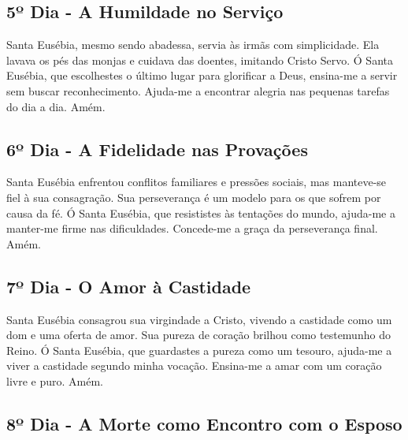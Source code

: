 \documentclass[a4paper,14pt]{extarticle} \usepackage[utf8]{inputenc}
\begin{document}
\underline{}

\subsection{5º Dia - A Humildade no Serviço}

\underline{}

Santa Eusébia, mesmo sendo abadessa, servia às irmãs com simplicidade. Ela lavava os pés das monjas e cuidava das doentes, imitando Cristo Servo.
Ó Santa Eusébia, que escolhestes o último lugar para glorificar a Deus, ensina-me a servir sem buscar reconhecimento. Ajuda-me a encontrar alegria nas pequenas tarefas do dia a dia. Amém.


\underline{}

\subsection{6º Dia - A Fidelidade nas Provações}

\underline{}

Santa Eusébia enfrentou conflitos familiares e pressões sociais, mas manteve-se fiel à sua consagração. Sua perseverança é um modelo para os que sofrem por causa da fé.
Ó Santa Eusébia, que resististes às tentações do mundo, ajuda-me a manter-me firme nas dificuldades. Concede-me a graça da perseverança final. Amém.


\underline{}

\subsection{7º Dia - O Amor à Castidade}

\underline{}

Santa Eusébia consagrou sua virgindade a Cristo, vivendo a castidade como um dom e uma oferta de amor. Sua pureza de coração brilhou como testemunho do Reino.
Ó Santa Eusébia, que guardastes a pureza como um tesouro, ajuda-me a viver a castidade segundo minha vocação. Ensina-me a amar com um coração livre e puro. Amém.


\underline{}

\subsection{8º Dia - A Morte como Encontro com o Esposo}
\end{document}
